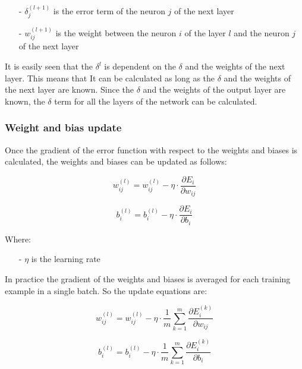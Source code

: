 \begin{itemize}
    \item[-] $\delta_j^{(l+1)}$ is the error term of the neuron $j$ of the next layer
    \item[-] $w_{ij}^{(l+1)}$ is the weight between the neuron $i$ of the layer $l$ and the neuron $j$ of the next layer
\end{itemize}

It is easily seen that the $\delta^l$ is dependent on the $\delta$ and the weights of the next layer. This means that It
can be calculated as long as the $\delta$ and the weights of the next layer are known. Since the $\delta$ and the weights
of the output layer are known, the $\delta$ term for all the layers of the network can be calculated.

\subsubsection{Weight and bias update}

Once the gradient of the error function with respect to the weights and biases is calculated, the weights and biases
can be updated as follows:

\begin{equation}
    \label{eq:weightupdate}
    w_{ij}^{(l)} = w_{ij}^{(l)} - \eta \cdot \frac{\partial E_i}{\partial w_{ij}}
\end{equation}

\begin{equation}
    \label{eq:biasupdate}
    b_i^{(l)} = b_i^{(l)} - \eta \cdot \frac{\partial E_i}{\partial b_i}
\end{equation}

\noindent
Where:

\begin{itemize}
    \item[-] $\eta$ is the learning rate
\end{itemize}

In practice the gradient of the weights and biases is averaged for each training example in a single batch. So the update
equations are:

\begin{equation}
    \label{eq:weightupdatebatch}
    w_{ij}^{(l)} = w_{ij}^{(l)} - \eta \cdot \frac{1}{m} \sum_{k=1}^{m} \frac{\partial E_i^{(k)}}{\partial w_{ij}}
\end{equation}

\begin{equation}
    \label{eq:biasupdatebatch}
    b_i^{(l)} = b_i^{(l)} - \eta \cdot \frac{1}{m} \sum_{k=1}^{m} \frac{\partial E_i^{(k)}}{\partial b_i}
\end{equation}

